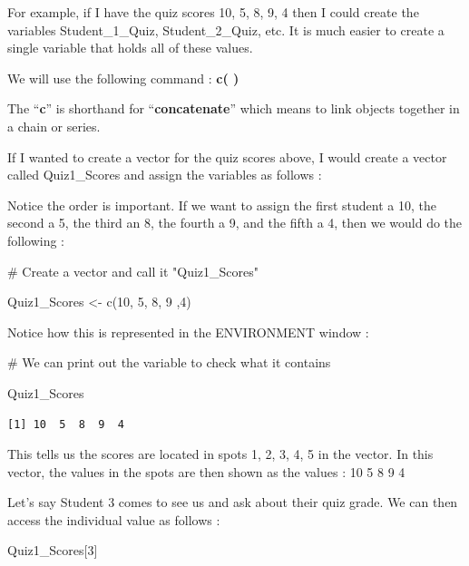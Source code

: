 \documentclass[
  letterpaper,
  DIV=11,
  numbers=noendperiod]{scrreprt}
\newenvironment{Shaded}{\begin{snugshade}}{\end{snugshade}}
\newcommand{\CommentTok}[1]{\textcolor[rgb]{0.37,0.37,0.37}{#1}}
\newcommand{\DecValTok}[1]{\textcolor[rgb]{0.68,0.00,0.00}{#1}}
\newcommand{\FunctionTok}[1]{\textcolor[rgb]{0.28,0.35,0.67}{#1}}
\newcommand{\NormalTok}[1]{\textcolor[rgb]{0.00,0.23,0.31}{#1}}
\newcommand{\OtherTok}[1]{\textcolor[rgb]{0.00,0.23,0.31}{#1}}
\begin{document}
For example, if I have the quiz scores 10, 5, 8, 9, 4 then I could
create the variables Student\_1\_Quiz, Student\_2\_Quiz, etc. It is much
easier to create a single variable that holds all of these values.

We will use the following command : \textbf{c( )}

The ``\textbf{c}'' is shorthand for ``\textbf{concatenate}'' which means
to link objects together in a chain or series.

If I wanted to create a vector for the quiz scores above, I would create
a vector called Quiz1\_Scores and assign the variables as follows :

Notice the order is important. If we want to assign the first student a
10, the second a 5, the third an 8, the fourth a 9, and the fifth a 4,
then we would do the following :

\begin{Shaded}
\begin{Highlighting}[]
\CommentTok{\# Create a vector and call it "Quiz1\_Scores" }

\NormalTok{Quiz1\_Scores }\OtherTok{\textless{}{-}} \FunctionTok{c}\NormalTok{(}\DecValTok{10}\NormalTok{, }\DecValTok{5}\NormalTok{, }\DecValTok{8}\NormalTok{, }\DecValTok{9}\NormalTok{ ,}\DecValTok{4}\NormalTok{)}
\end{Highlighting}
\end{Shaded}

Notice how this is represented in the ENVIRONMENT window :

\begin{Shaded}
\begin{Highlighting}[]
\CommentTok{\# We can print out the variable to check what it contains}

\NormalTok{Quiz1\_Scores     }
\end{Highlighting}
\end{Shaded}

\begin{verbatim}
[1] 10  5  8  9  4
\end{verbatim}

This tells us the scores are located in spots 1, 2, 3, 4, 5 in the
vector. In this vector, the values in the spots are then shown as the
values : 10 5 8 9 4

Let's say Student 3 comes to see us and ask about their quiz grade. We
can then access the individual value as follows :

\begin{Shaded}
\begin{Highlighting}[]
\NormalTok{Quiz1\_Scores[}\DecValTok{3}\NormalTok{]}
\end{Highlighting}
\end{Shaded}
\end{document}
